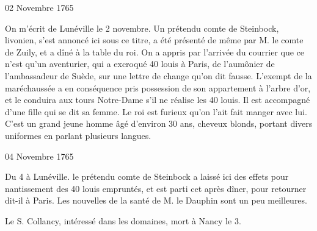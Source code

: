                      \begin{diary}{02 Novembre 1765}{}

                         On m'écrit de Lunéville le 2 novembre.
                           Un prétendu comte de
                              Steinbock, livonien,
                           s'est annoncé ici sous ce titre, a été présenté
                           de même par M. le comte de
                              Zuily, et a dîné
                           à la table du roi. On a appris par l'arrivée
                           du courrier que ce n'est qu'un aventurier,
                           qui a excroqué 40 louis à Paris,
                           de l'aumônier
                              de l'ambassadeur de Suède, sur une lettre de
                           change qu'on dit fausse. L'exempt de la maréchaussée
                           a en conséquence pris possession de son
                           appartement à l'arbre d'or, et le conduira
                           aux tours Notre-Dame s'il ne réalise les 40 louis.
                           Il est accompagné d'une fille qui se dit sa femme.
                           Le roi est furieux qu'on
                           l'ait fait manger
                           avec lui. C'est un grand jeune homme âgé
                           d'environ 30 ans, cheveux blonds, portant
                           divers uniformes en parlant plusieurs langues. \bigskip


                     \end{diary}

                     \begin{diary}{04 Novembre 1765}{}

                         Du 4 à Lunéville. le
                              prétendu comte de
                              Steinbock a laissé ici des effets pour nantissement
                           des 40
                              louis empruntés, et est parti cet après
                           dîner, pour retourner dit-il à Paris. Les nouvelles
                           de la santé de M. le
                              Dauphin sont un peu meilleures. \bigskip



                           Le S. Collancy, intéressé dans
                           les domaines,
                           mort à Nancy
                           le 3. \bigskip


                     \end{diary}

